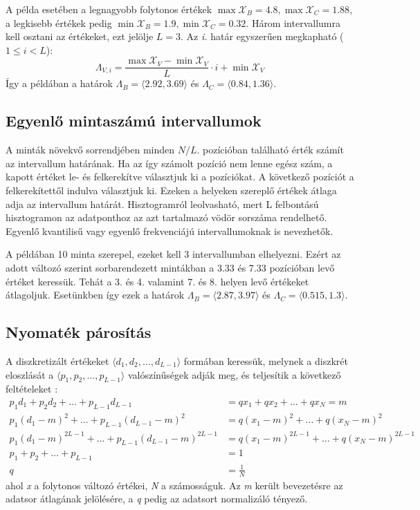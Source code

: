 A példa esetében a legnagyobb folytonos értékek $\max \mathcal{X}_{B} = 4.8, \max \mathcal{X}_{C} = 1.88$, a legkisebb értékek pedig $\min \mathcal{X}_{B} = 1.9, \min \mathcal{X}_{C} = 0.32$. Három intervallumra kell osztani az értékeket, ezt jelölje $L=3$. Az \emph{i.} határ egyszerűen megkapható ($1 \leq i < L$):
$$ \Lambda_{V, i} = \frac{\max \mathcal{X}_{V} - \min \mathcal{X}_{V}}{L} \cdot i + \min \mathcal{X}_{V} $$
Így a példában a határok $\Lambda_{B} = \langle 2.92, 3.69 \rangle$ és  $\Lambda_{C} = \langle 0.84, 1.36 \rangle$.

\subsection{Egyenlő mintaszámú intervallumok}
A minták növekvő sorrendjében minden $N / L$. pozícióban található érték számít az intervallum határának. Ha az így számolt pozíció nem lenne egész szám, a kapott értéket le- és felkerekítve választjuk ki a pozíciókat. A következő pozíciót a felkerekítettől indulva választjuk ki. Ezeken a helyeken szereplő értékek átlaga adja az intervallum határát. Hisztogramról leolvasható, mert L felbontású hisztogramon az adatponthoz az azt tartalmazó vödör sorszáma rendelhető. Egyenlő kvantilisű vagy egyenlő frekvenciájú intervallumoknak is nevezhetők.

A példában 10 minta szerepel, ezeket kell 3 intervallumban elhelyezni. Ezért az adott változó szerint sorbarendezett mintákban a 3.33 és 7.33 pozícióban levő értéket keressük. Tehát a 3. és 4. valamint 7. és 8. helyen levő értékeket átlagoljuk. Esetünkben így ezek a határok $\Lambda_{B} = \langle 2.87, 3.97 \rangle$ és  $\Lambda_{C} = \langle 0.515, 1.3 \rangle$.

\subsection{Nyomaték párosítás}
A diszkretizált értékeket $\langle d_{1}, d_{2}, \dots, d_{L-1}\rangle$ formában keressük, melynek a diszkrét eloszlását a $\langle p_{1}, p_{2}, \dots, p_{L-1}\rangle$ valószínűségek adják meg, és teljesítik a következő feltételeket \cite{nojavan2017comparative}:
\begin{align}
    p_{1}d_{1} + p_{2}d_{2} + \dots + p_{L-1}d_{L-1} &= q x_{1} + q x_{2} + \dots + q x_{N} = m \\
    p_{1}(d_{1} - m)^{2} + \dots + p_{L-1}(d_{L-1} - m)^{2} &= q(x_{1} - m)^{2} + \dots + q(x_{N} - m)^{2} \\
    p_{1}(d_{1} - m)^{2L-1} + \dots + p_{L-1}(d_{L-1} - m)^{2L-1} &= q(x_{1} - m)^{2L-1} + \dots + q(x_{N} - m)^{2L-1} \\
    p_{1} + p_{2} + \dots + p_{L-1} &= 1 \\
    q &= \frac{1}{N}
\end{align}
ahol \emph{x} a folytonos változó értékei, \emph{N} a számosságuk. Az \emph{m} került bevezetésre az adatsor átlagának jelölésére, a \emph{q} pedig az adatsort normalizáló tényező.

